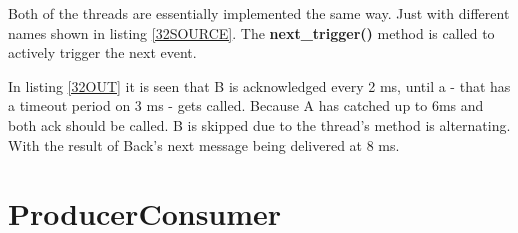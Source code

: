 \documentclass[a4paper,12pt]{report}    %
\begin{document}
Both of the threads are essentially implemented the same way. Just with different names shown in listing \ref{32SOURCE}. The \textbf{next\_trigger()} method is called to actively trigger the next event.

 

In listing \ref{32OUT} it is seen that B is acknowledged every 2 ms, until a - that has a timeout period on 3 ms - gets called. Because A has catched up to 6ms and both ack should be called. B is skipped due to the thread's method is alternating. With the result of Back's next message being delivered at 8 ms.

\lstset{style=output}






\section{ProducerConsumer}



\lstset{style=output}

\end{document}
